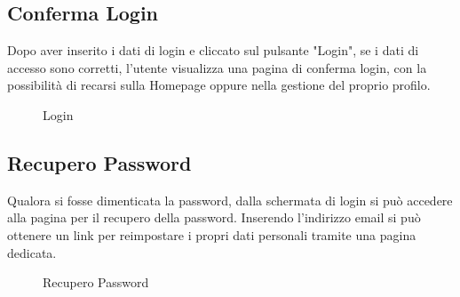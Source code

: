 \subsection{Conferma Login}
Dopo aver inserito i dati di login e cliccato sul pulsante "Login", se i dati di accesso sono corretti, l'utente visualizza una pagina di conferma login, con la possibilità di recarsi sulla Homepage oppure nella gestione del proprio profilo.

\label{Conferma Login}
\begin{figure}[H]
	\centering
	\caption{Login}
\end{figure}



\subsection{Recupero Password}
Qualora si fosse dimenticata la password, dalla schermata di login si può accedere alla pagina per il recupero della password. Inserendo l'indirizzo email si può ottenere un link per reimpostare i propri dati personali tramite una pagina dedicata. 

\label{Recupero Password}
\begin{figure}[H]
	\centering
	\caption{Recupero Password}
\end{figure}
